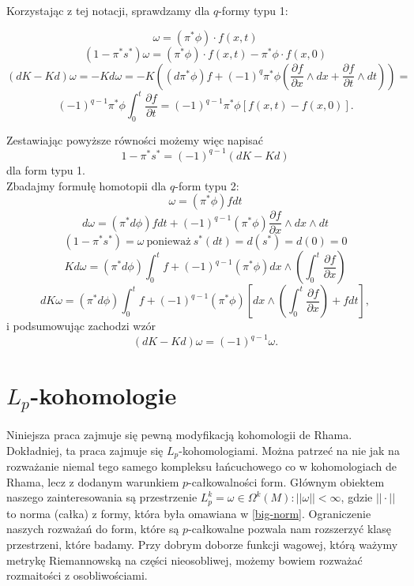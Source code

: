 \documentclass[licencjacka]{pracamgr}
\theoremstyle{definition}
\theoremstyle{definition}
\theoremstyle{plain}
\theoremstyle{plain}
\theoremstyle{plain}
\begin{document}
Korzystając z tej notacji, sprawdzamy dla $q$-formy typu 1:

\[
    \omega = (\pi^\ast \phi) \cdot f(x,t)
\]
\[
    (1 - \pi^\ast s^\ast) \omega =
       (\pi^\ast \phi) \cdot f(x,t) - \pi^\ast \phi \cdot f(x,0)
\]
\[
    (dK - Kd) \omega = - K d\omega = 
    -K \left(
    (d \pi^\ast \phi)f +
    (-1)^q \pi^\ast \phi \left(
       \frac{\partial f}{\partial x} \wedge dx +
       \frac{\partial f}{\partial t} \wedge dt
       \right)
    \right) =
\]
\[
    (-1)^{q-1}\pi^\ast \phi \int_0^t \frac{\partial f}{\partial t}
    = (-1)^{q-1} \pi^\ast \phi [f(x,t) - f(x,0)].
\]

Zestawiając powyższe równości możemy więc napisać
\[
    1 - \pi^\ast s^\ast = (-1)^{q-1}(dK - Kd)
\]
dla form typu 1. \\

Zbadajmy formułę homotopii dla $q$-form typu 2:
\[
    \omega = (\pi^\ast \phi)f dt
\]
\[
    d\omega = (\pi^\ast d \phi)f dt + 
    (-1)^{q-1}(\pi^\ast \phi) \frac{\partial f}{\partial x} 
      \wedge dx \wedge dt
\]
\[
    (1 - \pi^\ast s^\ast) = \omega ~\text{ponieważ}~
     s^\ast(dt) = d(s^\ast) = d(0) = 0
\]
\[
    Kd\omega = (\pi^\ast d\phi) \int_0^tf +
      (-1)^{q-1} (\pi^\ast \phi)
          dx \wedge (\int_0^t \frac{\partial f}{\partial x})
\]
\[
    dK\omega = (\pi^\ast d\phi) \int_0^tf +
      (-1)^{q-1} (\pi^\ast \phi)
      \left[
          dx \wedge (\int_0^t \frac{\partial f}{\partial x})
          + f dt
      \right],
\]
i podsumowując zachodzi wzór
\[
    (dK - Kd) \omega = (-1)^{q-1} \omega.
\]




\section{$L_p$-kohomologie}
Niniejsza praca zajmuje się pewną modyfikacją kohomologii de Rhama.
Dokładniej, ta praca zajmuje się $L_p$-kohomologiami. Można patrzeć
na nie jak na rozważanie niemal tego samego kompleksu łańcuchowego co w
kohomologiach de Rhama, lecz z dodanym warunkiem $p$-całkowalności form. Głównym
obiektem naszego zainteresowania są przestrzenie 
$L_p^k = {\omega \in \Omega^k(M): ||\omega|| <\infty}$, gdzie $|| \cdot ||$
to norma (całka) z formy, która była omawiana w \ref{big-norm}. Ograniczenie
naszych rozważań do form, które są $p$-całkowalne pozwala nam rozszerzyć
klasę przestrzeni, które badamy. Przy dobrym doborze funkcji wagowej, którą
ważymy metrykę Riemannowską na części nieosobliwej, możemy
bowiem rozważać rozmaitości z osobliwościami.\\
\end{document}
